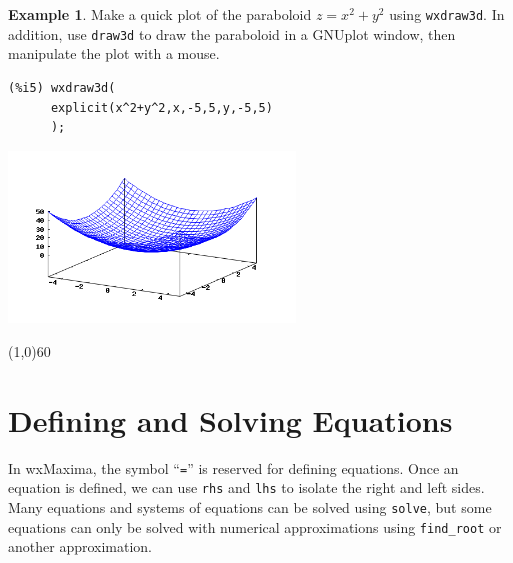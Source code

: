 \documentclass[10.5pt,twoside]{report}
\theoremstyle{definition}
\newtheorem{exmp}{Example}[section]
\begin{document}
\begin{exmp}  Make a quick plot of the paraboloid $z=x^2+y^2$ using \verb|wxdraw3d|.  In addition, use \verb|draw3d| to draw the paraboloid in a GNUplot window, then manipulate the plot with a mouse.\\



\begin{verbatim}
(%i5) wxdraw3d(
      explicit(x^2+y^2,x,-5,5,y,-5,5)
      );
\end{verbatim}

\includegraphics[width=3in]{example_0_3_4_1}

\end{exmp}

\line(1,0){60}
\linethickness{0.5mm}

\pagebreak


\section{Defining and Solving Equations}\label{Defining and Solving Equations}

In wxMaxima, the symbol ``\verb|=|'' is reserved for defining equations.  Once an equation is defined, we can use \verb|rhs| and \verb|lhs| to isolate the right and left sides.  Many equations and systems of equations can be solved using \verb|solve|, but some equations can only be solved with numerical approximations using \verb|find_root| or another approximation.
\end{document}
